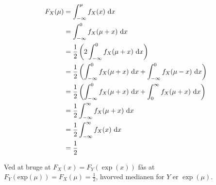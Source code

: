 \begin{align*}
F_X(\mu) &= \int_{-\infty}^\mu f_X(x)\ \mathrm{d} x \\
&=\int_{-\infty}^0 f_X(\mu + x)\ \mathrm{d} x \\
&=\frac{1}{2}\left(2\int_{-\infty}^0 f_X(\mu + x)\ \mathrm{d} x\right) \\
&=\frac{1}{2}\left(\int_{-\infty}^0 f_X(\mu + x)\ \mathrm{d} x + \int_{-\infty}^0 f_X(\mu - x)\ \mathrm{d} x\right) \\
&=\frac{1}{2}\left(\int_{-\infty}^0 f_X(\mu + x)\ \mathrm{d} x + \int_0^\infty f_X(\mu + x)\ \mathrm{d} x\right) \\
&=\frac{1}{2}\int_{-\infty}^\infty f_X(\mu + x)\ \mathrm{d} x \\
&=\frac{1}{2}\int_{-\infty}^\infty f_X(x)\ \mathrm{d} x \\
&=\frac{1}{2}
\end{align*}

Ved at bruge at $F_X(x) = F_Y(\exp(x))$ fås at $F_Y(\mathrm{exp}(\mu))
= F_X(\mu) = \frac{1}{2}$, hvorved medianen for $Y$ er $\exp(\mu)$.
